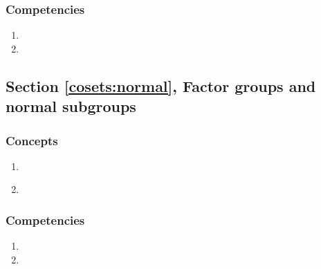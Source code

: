 \subsubsection*{Competencies}
\begin{enumerate}
\item
\item
\end{enumerate}


\subsection*{Section \ref{cosets:normal}, Factor groups and normal subgroups}
\subsubsection*{Concepts}
\begin{enumerate}
\item 
\
\
\
\item
\end{enumerate}

\subsubsection*{Competencies}
\begin{enumerate}
\item
\item
\end{enumerate}





